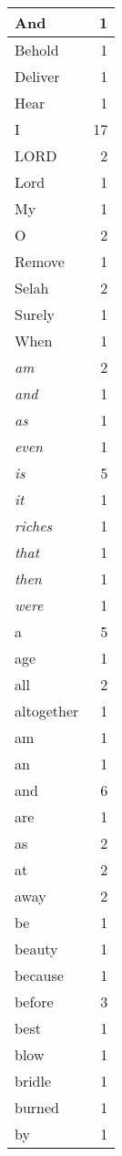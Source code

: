 \begin{center}
\begin{longtable}{l|r}
\hline \hline
\endlastfoot
And & 1 \\ \hline
Behold & 1 \\ \hline
Deliver & 1 \\ \hline
Hear & 1 \\ \hline
I & 17 \\ \hline
LORD & 2 \\ \hline
Lord & 1 \\ \hline
My & 1 \\ \hline
O & 2 \\ \hline
Remove & 1 \\ \hline
Selah & 2 \\ \hline
Surely & 1 \\ \hline
When & 1 \\ \hline
\emph{am} & 2 \\ \hline
\emph{and} & 1 \\ \hline
\emph{as} & 1 \\ \hline
\emph{even} & 1 \\ \hline
\emph{is} & 5 \\ \hline
\emph{it} & 1 \\ \hline
\emph{riches} & 1 \\ \hline
\emph{that} & 1 \\ \hline
\emph{then} & 1 \\ \hline
\emph{were} & 1 \\ \hline
a & 5 \\ \hline
age & 1 \\ \hline
all & 2 \\ \hline
altogether & 1 \\ \hline
am & 1 \\ \hline
an & 1 \\ \hline
and & 6 \\ \hline
are & 1 \\ \hline
as & 2 \\ \hline
at & 2 \\ \hline
away & 2 \\ \hline
be & 1 \\ \hline
beauty & 1 \\ \hline
because & 1 \\ \hline
before & 3 \\ \hline
best & 1 \\ \hline
blow & 1 \\ \hline
bridle & 1 \\ \hline
burned & 1 \\ \hline
by & 1 \\ \hline

\end{longtable}
\end{center}
